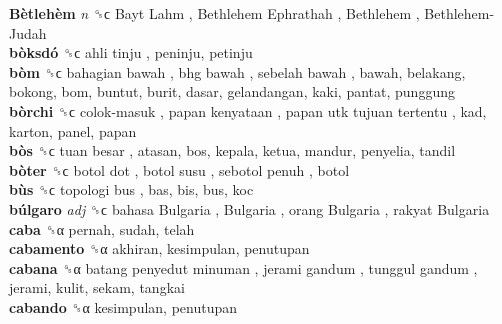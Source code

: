 \textbf{Bètlehèm} \emph{n}  ␝ϲ   Bayt Lahm ,  Bethlehem Ephrathah ,  Bethlehem ,  Bethlehem-Judah   \\
\textbf{bòksdó} ␝ϲ   ahli tinju , peninju, petinju  \\
\textbf{bòm} ␝ϲ   bahagian bawah ,  bhg bawah ,  sebelah bawah , bawah, belakang, bokong, bom, buntut, burit, dasar, gelandangan, kaki, pantat, punggung  \\
\textbf{bòrchi} ␝ϲ   colok-masuk ,  papan kenyataan ,  papan utk tujuan tertentu , kad, karton, panel, papan  \\
\textbf{bòs} ␝ϲ   tuan besar , atasan, bos, kepala, ketua, mandur, penyelia, tandil  \\
\textbf{bòter} ␝ϲ   botol dot ,  botol susu ,  sebotol penuh , botol  \\
\textbf{bùs} ␝ϲ   topologi bus , bas, bis, bus, koc  \\
\textbf{búlgaro} \emph{adj}  ␝ϲ   bahasa Bulgaria ,  Bulgaria ,  orang Bulgaria ,  rakyat Bulgaria   \\
\textbf{caba} ␝α  pernah, sudah, telah  \\
\textbf{cabamento} ␝α  akhiran, kesimpulan, penutupan  \\
\textbf{cabana} ␝α   batang penyedut minuman ,  jerami gandum ,  tunggul gandum , jerami, kulit, sekam, tangkai  \\
\textbf{cabando} ␝α  kesimpulan, penutupan  \\
